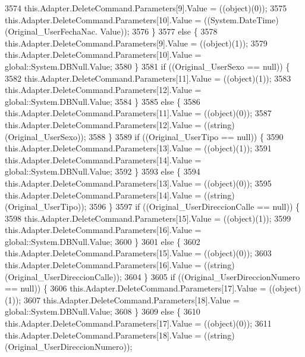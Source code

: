 \begin{DoxyCode}
3574                 this.Adapter.DeleteCommand.Parameters[9].Value = ((object)(0));
3575                 this.Adapter.DeleteCommand.Parameters[10].Value = ((System.DateTime)(Original\_UserFechaNac.
      Value));
3576             \}
3577             \textcolor{keywordflow}{else} \{
3578                 this.Adapter.DeleteCommand.Parameters[9].Value = ((object)(1));
3579                 this.Adapter.DeleteCommand.Parameters[10].Value = global::System.DBNull.Value;
3580             \}
3581             \textcolor{keywordflow}{if} ((Original\_UserSexo == null)) \{
3582                 this.Adapter.DeleteCommand.Parameters[11].Value = ((object)(1));
3583                 this.Adapter.DeleteCommand.Parameters[12].Value = global::System.DBNull.Value;
3584             \}
3585             \textcolor{keywordflow}{else} \{
3586                 this.Adapter.DeleteCommand.Parameters[11].Value = ((object)(0));
3587                 this.Adapter.DeleteCommand.Parameters[12].Value = ((string)(Original\_UserSexo));
3588             \}
3589             \textcolor{keywordflow}{if} ((Original\_UserTipo == null)) \{
3590                 this.Adapter.DeleteCommand.Parameters[13].Value = ((object)(1));
3591                 this.Adapter.DeleteCommand.Parameters[14].Value = global::System.DBNull.Value;
3592             \}
3593             \textcolor{keywordflow}{else} \{
3594                 this.Adapter.DeleteCommand.Parameters[13].Value = ((object)(0));
3595                 this.Adapter.DeleteCommand.Parameters[14].Value = ((string)(Original\_UserTipo));
3596             \}
3597             \textcolor{keywordflow}{if} ((Original\_UserDireccionCalle == null)) \{
3598                 this.Adapter.DeleteCommand.Parameters[15].Value = ((object)(1));
3599                 this.Adapter.DeleteCommand.Parameters[16].Value = global::System.DBNull.Value;
3600             \}
3601             \textcolor{keywordflow}{else} \{
3602                 this.Adapter.DeleteCommand.Parameters[15].Value = ((object)(0));
3603                 this.Adapter.DeleteCommand.Parameters[16].Value = ((string)(Original\_UserDireccionCalle));
3604             \}
3605             \textcolor{keywordflow}{if} ((Original\_UserDireccionNumero == null)) \{
3606                 this.Adapter.DeleteCommand.Parameters[17].Value = ((object)(1));
3607                 this.Adapter.DeleteCommand.Parameters[18].Value = global::System.DBNull.Value;
3608             \}
3609             \textcolor{keywordflow}{else} \{
3610                 this.Adapter.DeleteCommand.Parameters[17].Value = ((object)(0));
3611                 this.Adapter.DeleteCommand.Parameters[18].Value = ((string)(Original\_UserDireccionNumero));

\end{DoxyCode}
